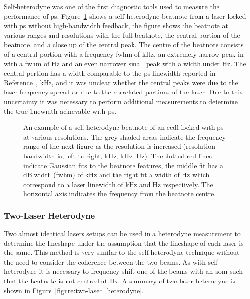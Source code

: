 Self-heterodyne was one of the first diagnostic tools used to measure the performance of \gls{ps}.
Figure~\ref{figure:self-heterodyne_example} shows a self-heterodyne beatnote from a laser locked with \gls{ps} without high-bandwidth feedback, the figure shows the beatnote at various ranges and resolutions with the full beatnote, the central portion of the beatnote, and a close up of the central peak.
The centre of the beatnote consists of a central portion with a frequency \gls{fwhm} of \unit[33]{kHz}, an extremely narrow peak in with a \gls{fwhm} of \unit[240]{Hz} and an even narrower small peak with a width under \unit[100]{Hz}.
The central portion has a width comparable to the \gls{ps} linewidth reported in Reference~\cite{torii_laser-phase_2012}, \unit[20]{kHz}, and it was unclear whether the central peaks were due to the laser frequency spread or due to the correlated portions of the laser.
Due to this uncertainty it was necessary to perform additional measurements to determine the true linewidth achievable with \gls{ps}.

\begin{figure}
\center

\caption[Example self-heterodyne beatnote.]{An example of a self-heterodyne beatnote of an \gls{ecdl} locked with \gls{ps} at various resolutions.
The grey shaded areas indicate the frequency range of the next figure as the resolution is increased (resolution bandwidth is, left-to-right, \unit[3]{kHz}, \unit[1]{kHz}, \unit[1]{Hz}).
The dotted red lines indicate Gaussian fits to the beatnote features, the middle fit has a \unit[-3]{dB} width (\gls{fwhm}) of \unit[77]{kHz} and the right fit a width of \unit[570]{Hz} which correspond to a laser linewidth of \unit[33]{kHz} and \unit[240]{Hz} respectively.
The horizontal axis indicates the frequency from the beatnote centre.}
\label{figure:self-heterodyne_example}
\end{figure}

\subsubsection{Two-Laser Heterodyne}\label{section:two-laser_heterodyen}

Two almost identical lasers setups can be used in a heterodyne measurement to determine the lineshape under the assumption that the lineshape of each laser is the same.
This method is very similar to the self-heterodyne technique without the need to consider the coherence between the two beams.
As with self-heterodyne it is necessary to frequency shift one of the beams with an \gls{aom} such that the beatnote is not centred at \unit[0]{Hz}.
A summary of two-laser heterodyne is shown in Figure~\ref{figure:two-laser_heterodyne}.

